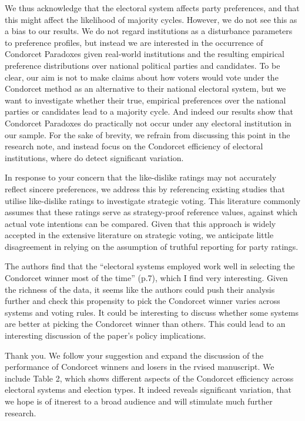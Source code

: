 \documentclass[a4paper, 12pt]{scrartcl}
\theoremstyle{break}
\newenvironment{changes}{\par\color{violet}\par\addvspace{\baselineskip}}{\par\addvspace{\baselineskip}}
\begin{document}
We thus acknowledge that the electoral system affects party preferences, and that this might affect the likelihood of majority cycles. However, we do not see this as a bias to our results. We do not regard institutions as a disturbance parameters to  preference profiles, but  instead we are interested in the occurrence of Condorcet Paradoxes given real-world institutions and the resulting empirical preference distributions over national political parties and candidates. To be clear, our aim is not to make claims about how voters would vote under the Condorcet method as an alternative to their national electoral system, but we want to investigate whether their true, empirical preferences over the national parties or candidates lead to a majority cycle. And indeed our results show that Condorcet Paradoxes do practically not occur under any electoral institution in our sample.  For the sake of brevity, we refrain from discussing this point in the research note, and instead focus on the Condorcet efficiency of electoral institutions, where do detect significant variation.

In response to your concern that the like-dislike ratings may not accurately reflect sincere preferences, we address this by referencing existing studies that utilise like-dislike ratings to investigate strategic voting. This literature commonly assumes that these ratings serve as strategy-proof reference values, against which actual vote intentions can be compared. Given that this approach is widely accepted in the extensive literature on strategic voting, we anticipate little disagreement in relying on the assumption of truthful reporting for party ratings.


\begin{changes}
	The authors ﬁnd that the “electoral systems employed work well in selecting the Condorcet winner most of the time” (p.7), which I ﬁnd very interesting. Given the richness of the data, it seems like the authors could push their analysis further and check this propensity to pick the 	Condorcet winner varies across systems and voting rules. It could be interesting to discuss whether some systems are better at picking the Condorcet winner than others. This could lead to an interesting discussion of the paper’s policy implications.
\end{changes}

Thank you. We follow your suggestion and expand the discussion of the performance of Condorcet winners and losers in the rvised manuscript. We include Table 2, which shows different aspects of the Condorcet efficiency across electoral systems and election types. It indeed reveals significant variation, that we hope is of itnerest to a broad audience and will stimulate much further research. 
\end{document}
